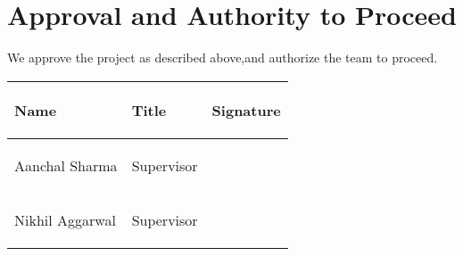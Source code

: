 \documentclass{article}
\begin{document}
\section*{Approval and Authority to Proceed}

We approve the project as described above,and authorize the team to proceed.


\begin{center}
\begin{tabular}{ |p{9em}|p{9em}|p{9em}| }
    \hline
    \begin{center}\textbf{Name}\end{center} & \begin{center}\textbf{Title}\end{center} & \begin{center}\textbf{Signature}\end{center} \\
    \hline
    \begin{center}{Aanchal Sharma}\end{center} & \begin{center}{Supervisor}\end{center}&\\
    \hline
    \begin{center}{Nikhil Aggarwal}\end{center} & \begin{center}{Supervisor}\end{center}&\\
    \hline
\end{tabular}
\end{center}
\end{document}
